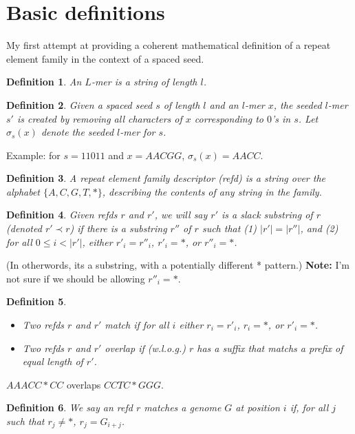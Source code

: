 \documentclass{article}
\newtheorem{definition}{Definition}
\begin{document}
\section{Basic definitions}

My first attempt at providing a coherent mathematical definition of a
repeat element family in the context of a spaced seed.

\begin{definition}
An $L$-mer is a string of length $l$.
\end{definition}

\begin{definition}
Given a spaced seed $s$ of length $l$ and an $l$-mer $x$, the {\it seeded
$l$-mer} $s'$ is created by removing all characters of $x$
corresponding to $0$'s in $s$.  Let $\sigma_s(x)$ denote the seeded
$l$-mer for $s$.
\end{definition}
Example: for $s=11011$ and $x = AACGG$, $\sigma_s(x) = AACC$.

\begin{definition}
  A {\it repeat element family descriptor (refd)} is a
  string over the alphabet $\{A,C,G,T,*\}$, describing the contents
  of any string in the family.
\end{definition}

\begin{definition}
  Given refds $r$ and $r'$, we will say $r'$ is a {\it slack
    substring} of $r$ (denoted $r' \prec r$) if there is a
  substring $r''$ of $r$ such that (1) $|r'|=|r''|$, and (2) for all
  $0 \leq i < |r'|$, either $r'_i = r''_i$, $r'_i = *$, or $r''_i=*$.
\end{definition}
(In otherwords, its a substring, with a potentially different *
pattern.)
{\bf Note: } I'm not sure if we should be allowing $r''_i=*$.

\begin{definition}
 \begin{itemize}
 \item Two refds $r$ and $r'$ match if for all $i$ either $r_i = r'_i$, $r_i=*$, or $r'_i = *$.
 \item Two refds $r$ and $r'$ overlap if (w.l.o.g.) $r$ has a suffix that matchs a prefix of equal length of $r'$.
 \end{itemize}
\end{definition}
$AAACC*CC$ overlaps $CCTC*GGG$.


\begin{definition}
  We say an refd $r$ {\it matches} a genome $G$ at position $i$ if, for
  all $j$ such that $r_j \neq *$, $r_j = G_{i+j}$.
\end{definition}
\end{document}
